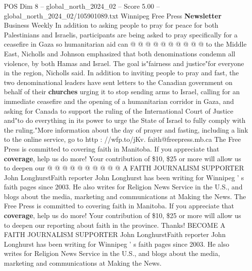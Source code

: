 \begin{textsample}{POS Dim 8 – global\_north\_2024\_02 – Score 5.00 – global\_north\_2024\_02/105901089.txt}
Winnipeg Free Press \textbf{Newsletter} Business Weekly In addition to asking people to pray for peace for both Palestinians and Israelis, participants are being asked to pray specifically for a ceasefire in Gaza so humanitarian aid can @ @ @ @ @ @ @ @ @ @ to the Middle East, Nicholls and Johnson emphasized that both denominations condemn all violence, by both Hamas and Israel.
The goal is"fairness and justice"for everyone in the region, Nicholls said.
In addition to inviting people to pray and fast, the two denominational leaders have sent letters to the Canadian government on behalf of their \textbf{churches} urging it to stop sending arms to Israel, calling for an immediate ceasefire and the opening of a humanitarian corridor in Gaza, and asking for Canada to support the ruling of the International Court of Justice and"to do everything in its power to urge the State of Israel to fully comply with the ruling."More information about the day of prayer and fasting, including a link to the online service, go to http : //wfp.to/jKv. faith@freepress.mb.ca The Free Press is committed to covering faith in Manitoba.
If you appreciate that \textbf{coverage}, help us do more!
Your contribution of \$10, \$25 or more will allow us to deepen our @ @ @ @ @ @ @ @ @ @ A FAITH JOURNALISM SUPPORTER John LonghurstFaith reporter John Longhurst has been writing for Winnipeg ' s faith pages since 2003.
He also writes for Religion News Service in the U.S., and blogs about the media, marketing and communications at Making the News.
The Free Press is committed to covering faith in Manitoba.
If you appreciate that \textbf{coverage}, help us do more!
Your contribution of \$10, \$25 or more will allow us to deepen our reporting about faith in the province.
Thanks!
BECOME A FAITH JOURNALISM SUPPORTER John LonghurstFaith reporter John Longhurst has been writing for Winnipeg ' s faith pages since 2003.
He also writes for Religion News Service in the U.S., and blogs about the media, marketing and communications at Making the News.

\end{textsample}
